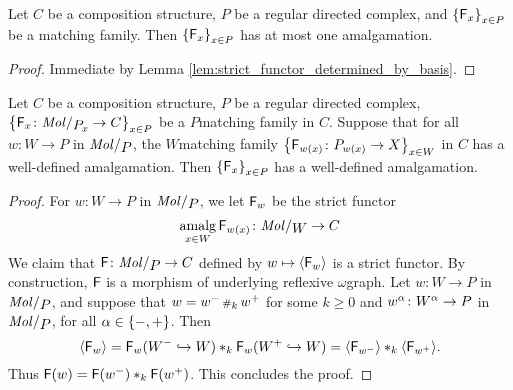 \begin{lem}\label{lem:at_most_one_lift}
    Let \( C \) be a composition structure, \( P \) be a regular directed complex, and \( \left\{ {\mathsf{F}_x} \right\}_{x \in P} \) be a matching family. 
    Then \( \left\{ {\mathsf{F}_x} \right\}_{x \in P} \) has at most one amalgamation.
\end{lem}
\begin{proof}
    Immediate by Lemma \ref{lem:strict_functor_determined_by_basis}.
\end{proof}

\begin{lem} \label{lem:well_define_from_regular_iff_well_defined_from_molecules}
    Let \( C \) be a composition structure, \( P \) be a regular directed complex, \( \set{\F_x \colon \molecin{\imel{P}{x}} \to C}_{x \in P} \) be a \( P \)\nbd matching family in \( C \). 
    Suppose that for all \( w \colon W \to P \) in \( \molecin{P} \), the \( W \)\nbd matching family \( \left\{ {\mathsf{F}_{w(x)} \colon {P}_{w(x)} \to X} \right\}_{x \in W} \) in \( C \) has a well-defined amalgamation.
    Then \( \left\{ {\mathsf{F}_x} \right\}_{x \in P} \) has a well-defined amalgamation.
\end{lem}
\begin{proof}
    For \( w \colon W \to P \) in \( \molecin{P} \), we let \( \mathsf{F}_w \) be the strict functor 
    \begin{equation*}
        \amalg_{x \in W} \F_{w(x)} \colon \molecin{W} \to C
    \end{equation*}
    We claim that \( \F \colon \molecin{P} \to C \) defined by \( w \mapsto \langle\mathsf{F}_w\rangle \) is a strict functor.
    By construction, \( \mathsf{F} \) is a morphism of underlying reflexive \( \omega \)\nbd graph.
    Let \( w \colon W \to P \) in \( \molecin{P} \), and suppose that \( w = w^- \,{\scriptstyle\#}_{k}\, w^+ \) for some \( k \geq 0 \) and \( w^\alpha \colon W^\alpha \to P \) in \( \molecin{P} \), for all \( \alpha \in \left\{ {-, +} \right\} \).
    Then
    \begin{equation*}
        \langle\mathsf{F}_w\rangle = \mathsf{F}_w(W^- \hookrightarrow W) *_{k} \mathsf{F}_w(W^+ \hookrightarrow W) = \langle\mathsf{F}_{w^-}\rangle *_{k} \langle\mathsf{F}_{w^+}\rangle.
    \end{equation*}
    Thus \( \mathsf{F}(w) = \mathsf{F}(w^-) *_{k} \mathsf{F}(w^+) \).
    This concludes the proof.
\end{proof}

